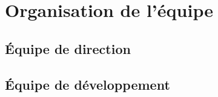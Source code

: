 \section{Organisation de l'équipe}
	\subsection{Équipe de direction}
	\subsection{Équipe de développement}